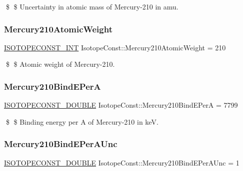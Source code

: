 \$ \$ Uncertainty in atomic mass of Mercury-\/210 in amu. \mbox{\label{group___isotope_const-_mercury-_hg210_ga6d4969b8687d1baccebd2289374d139d}} 
\subsubsection{\texorpdfstring{Mercury210\+Atomic\+Weight}{Mercury210AtomicWeight}}
{\footnotesize\ttfamily \mbox{\hyperlink{group___isotope_const-_macros_ga5f18360b3e99483a35c32d789e62621c}{I\+S\+O\+T\+O\+P\+E\+C\+O\+N\+S\+T\+\_\+\+I\+NT}} Isotope\+Const\+::\+Mercury210\+Atomic\+Weight = 210}

\$ \$ Atomic weight of Mercury-\/210. \mbox{\label{group___isotope_const-_mercury-_hg210_ga2414815ac9fea2aac9aae2b63cfb0e60}} 
\subsubsection{\texorpdfstring{Mercury210\+Bind\+E\+PerA}{Mercury210BindEPerA}}
{\footnotesize\ttfamily \mbox{\hyperlink{group___isotope_const-_macros_ga8f45a7272ce02c0b4c65c44636ed719a}{I\+S\+O\+T\+O\+P\+E\+C\+O\+N\+S\+T\+\_\+\+D\+O\+U\+B\+LE}} Isotope\+Const\+::\+Mercury210\+Bind\+E\+PerA = 7799}

\$ \$ Binding energy per A of Mercury-\/210 in keV. \mbox{\label{group___isotope_const-_mercury-_hg210_ga3dbe9d09d66b20ab915bff90e283c01a}} 
\subsubsection{\texorpdfstring{Mercury210\+Bind\+E\+Per\+A\+Unc}{Mercury210BindEPerAUnc}}
{\footnotesize\ttfamily \mbox{\hyperlink{group___isotope_const-_macros_ga8f45a7272ce02c0b4c65c44636ed719a}{I\+S\+O\+T\+O\+P\+E\+C\+O\+N\+S\+T\+\_\+\+D\+O\+U\+B\+LE}} Isotope\+Const\+::\+Mercury210\+Bind\+E\+Per\+A\+Unc = 1}

